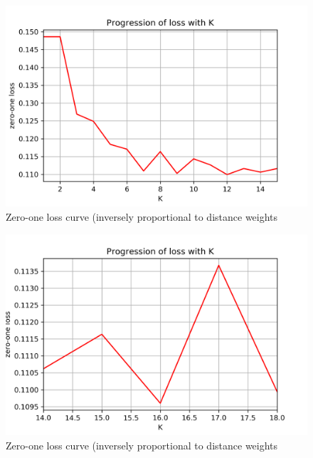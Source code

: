 \documentclass[a4paper]{article}
\begin{document}
\begin{figure}[H]
    \centering
    \includegraphics[width=12cm]{error_distance_(mid_zoom)}
    \caption{Zero-one loss curve (inversely proportional to distance weights}
    \label{fig:ex2-b-error_distance_1}
\end{figure}

\begin{figure}[H]
    \centering
    \includegraphics[width=12cm]{error_distance_(full_zoom)}
    \caption{Zero-one loss curve (inversely proportional to distance weights}
    \label{fig:ex2-b-error_distance_2}
\end{figure}

\end{document}
